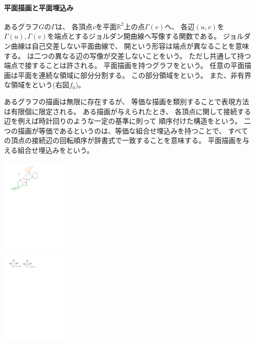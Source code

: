 \begin{paracol}{2}
\paragraph{平面描画と平面埋込み}
あるグラフ$G$の$\Gamma$は、
各頂点$v$を平面${\mathbb R}^2$上の点$\Gamma(v)$へ、
各辺$(u, v)$を$\Gamma(u), \Gamma(v)$を端点とするジョルダン開曲線へ写像する関数である。
ジョルダン曲線は自己交差しない平面曲線で、
開という形容は端点が異なることを意味する。
は二つの異なる辺の写像が交差しないことをいう。
ただし共通して持つ端点で接することは許される。
平面描画を持つグラフをという。
任意の平面描画は平面を連続な領域に部分分割する。
この部分領域をという。
また、非有界な領域をという(右図$f_0$)。

あるグラフの描画は無限に存在するが、
等価な描画を類別することで表現方法は有限個に限定される。
ある描画が与えられたとき、
各頂点に関して接続する辺を例えば時計回りのような一定の基準に則って
順序付けた構造をという。
二つの描画が等価であるというのは、等価な組合せ埋込みを持つことで、
すべての頂点の接続辺の回転順序が辞書式で一致することを意味する。
平面描画を与える組合せ埋込みをという。



\switchcolumn
\centering
\vspace{0.5\intextsep}
\includegraphics[width=0.24\textwidth]{figures/planar_drawing.pdf}

\vspace{1.\intextsep}
\includegraphics[width=0.24\textwidth]{figures/combinatorial_embedding.pdf}

\end{paracol}



